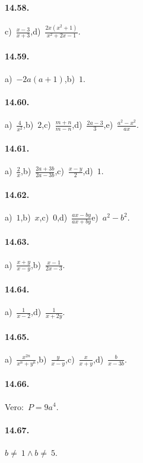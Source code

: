 \paragraph{14.58.}
c)~$\frac{x-3}{x+3}$,\quad d)~$\frac{2x\left(x^{2}+1\right)}{x^{2}+2x-1}$.

\paragraph{14.59.}
a)~$-2a(a+1)$,\quad b)~$1$.

\paragraph{14.60.}
a)~$\frac{4}{x^{2}}$,\quad b)~$2$,\quad c)~$\frac{m+n}{m-n}$,\quad d)~$\frac{2a-3}{3}$,\quad e)~$\frac{a^{2}-x^{2}}{ax}$.

\paragraph{14.61.}
a)~$\frac{2}{x}$,\quad b)~$\frac{2a+3b}{2a-3b}$,\quad c)~$\frac{x-y}{2}$,\quad d)~$1$.

\paragraph{14.62.}
a)~$1$,\quad b)~$x$,\quad c)~$0$,\quad d)~$\frac{ax-by}{ax+by}$\quad e)~$a^{2}-b^{2}$.

\paragraph{14.63.}
a)~$\frac{x+y}{x-y}$,\quad b)~$\frac{x-1}{2x-3}$.

\paragraph{14.64.}
a)~$\frac{1}{x-2}$,\quad d)~$\frac{1}{x+2y}$.

\paragraph{14.65.}
a)~$\frac{x^{2n}}{x^{n}+y^{n}}$,\quad b)~$\frac{y}{x-y}$,\quad c)~$\frac{x}{x+y}$,\quad d)~$\frac{b}{x-3b}$.

\paragraph{14.66.}Vero:~$P=9a^{4}$.

\paragraph{14.67.}$b\neq~1\wedge b\neq~5$.
